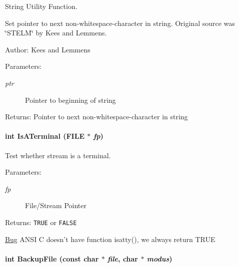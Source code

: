 String Utility Function. 

Set pointer to next non-whitespace-character in string. Original source was \char`\"{}STELM\char`\"{} by Kees and Lemmens.

\begin{Desc}
\item[Author:]Kees and Lemmens\end{Desc}
\begin{Desc}
\item[Parameters:]
\begin{description}
\item[{\em ptr}]Pointer to beginning of string \end{description}
\end{Desc}
\begin{Desc}
\item[Returns:]Pointer to next non-whitespace-character in string \end{Desc}
\hypertarget{group__utilities_g9a90e738d03b642f33901600671d225a}{
\paragraph[{IsATerminal}]{\setlength{\rightskip}{0pt plus 5cm}int IsATerminal (FILE $\ast$ {\em fp})}\hfill}
\label{group__utilities_g9a90e738d03b642f33901600671d225a}


Test whether stream is a terminal. 

\begin{Desc}
\item[Parameters:]
\begin{description}
\item[{\em fp}]File/Stream Pointer \end{description}
\end{Desc}
\begin{Desc}
\item[Returns:]{\tt TRUE} or {\tt FALSE} \end{Desc}
\begin{Desc}
\item[\hyperlink{bug__bug000002}{Bug}]ANSI C doesn't have function isatty(), we always return TRUE\end{Desc}
\hypertarget{group__utilities_g0fccda7427db33b2f73a3b6dca864207}{
\paragraph[{BackupFile}]{\setlength{\rightskip}{0pt plus 5cm}int BackupFile (const char $\ast$ {\em file}, \/  char $\ast$ {\em modus})}\hfill}
\label{group__utilities_g0fccda7427db33b2f73a3b6dca864207}


